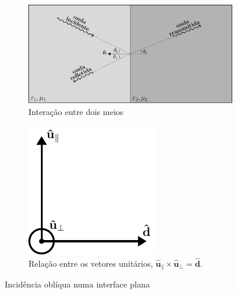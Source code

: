 \begin{figure}[H]
    \centering
    \begin{subfigure}[c]{0.55\linewidth}
        \centering
        \includegraphics[width=\linewidth]{img/1/Incidencia-obliqua.pdf}
        \caption{Interação entre dois meios}
    \end{subfigure}\hfil
    \begin{subfigure}[c]{0.2\linewidth}
        \centering
        \includegraphics[width=\linewidth]{img/1/Vetores-unitarios.pdf}
        \caption{Relação entre os vetores unitários, $\mathbf{\hat{u}}_{\parallel} \times \mathbf{\hat{u}}_{\perp} = \mathbf{\hat{d}}$.}
    \end{subfigure}
    \caption{Incidência oblíqua numa interface plana}
    \label{fig:Incidencia-obliqua}
\end{figure}

